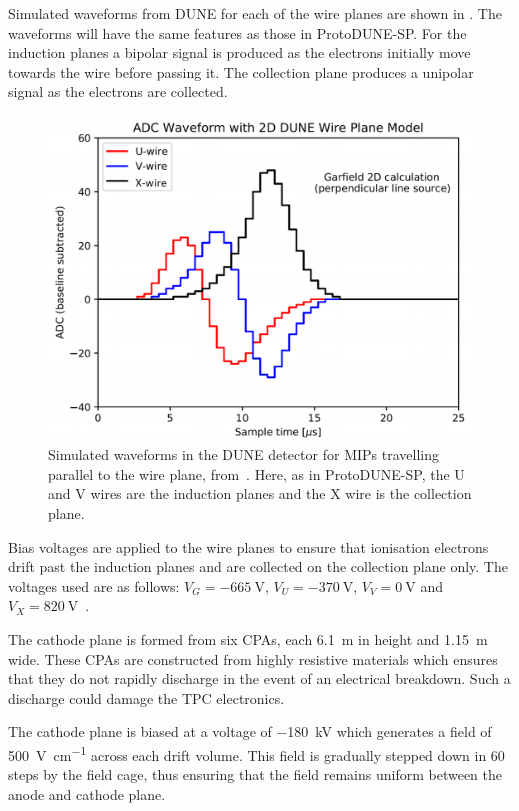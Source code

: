 Simulated waveforms from DUNE for each of the wire planes are shown in . 
The waveforms will have the same features as those in ProtoDUNE-SP.
For the induction planes a bipolar signal is produced as the electrons initially move towards the wire before passing it.
The collection plane produces a unipolar signal as the electrons are collected.

\begin{figure}[h]
	\centering
	\includegraphics[width=.6\linewidth]{files/figures/protodune_detector/wireSignals}
	\caption[Simulated waveforms in the DUNE detector for MIPs travelling parallel to the wire plane]{Simulated waveforms in the DUNE detector for MIPs travelling parallel to the wire plane, from~\cite{tdrVol2}. Here, as in ProtoDUNE-SP, the U and V wires are the induction planes and the X wire is the collection plane.}
	\label{fig:wireSignals}
\end{figure}

Bias voltages are applied to the wire planes to ensure that ionisation electrons drift past the induction planes and are collected on the collection plane only.
The voltages used are as follows: $V_{G} = \SI{-665}{\volt}$, $V_{U} = \SI{-370}{\volt}$, $V_{V} = \SI{0}{\volt}$ and $V_{X} = \SI{+820}{\volt}$~\cite{protodunePerformance}.

The cathode plane is formed from six CPAs, each \SI{6.1}{\m} in height and \SI{1.15}{\m} wide.
These CPAs are constructed from highly resistive materials which ensures that they do not rapidly discharge in the event of an electrical breakdown.
Such a discharge could damage the TPC electronics.

The cathode plane is biased at a voltage of \SI{-180}{\kilo\volt} which generates a field of \SI{500}{\volt\per\cm} across each drift volume.
This field is gradually stepped down in 60 steps by the field cage, thus ensuring that the field remains uniform between the anode and cathode plane.


